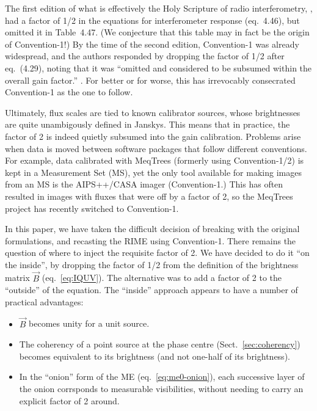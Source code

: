 \documentclass[]{aa}
\begin{document}
The first edition of what is effectively the Holy Scripture of radio interferometry, \citet*{tms1}, had a factor of 1/2 in the equations for interferometer response (eq.~4.46), but omitted it in Table~4.47. (We conjecture that this table may in fact be the origin of Convention-1!) By the time of the second edition, Convention-1 was already widespread, and the authors responded by dropping the factor of 1/2 after eq.~(4.29), noting that it was ``omitted and considered to be subsumed within the overall gain factor.'' \citep[see p. 102]{tms}. For better or for worse, this has irrevocably consecrated Convention-1 as the one to follow.

Ultimately, flux scales are tied to known calibrator sources, whose brightnesses are quite unambigously defined in Janskys. This means that in practice, the factor of 2 is indeed quietly subsumed into the gain calibration. Problems arise when data is moved between software packages that follow different conventions. For example, data calibrated with MeqTrees (formerly using 
Convention-1/2) is kept in a Measurement Set (MS), yet the only tool available for making images from an MS is the AIPS++/CASA imager (Convention-1.) This has often resulted in images with fluxes that were off by a factor of 2, so the MeqTrees project has recently switched to Convention-1.

In this paper, we have taken the difficult decision of breaking with the original formulations, and recasting the RIME using Convention-1. There remains the question of where to inject the requisite factor of 2. We have decided to do it ``on the inside'', by dropping the factor of 1/2 from the \citet{ME4} definition of the brightness matrix $\vec B$ (eq.~\ref{eq:IQUV}). The alternative was to add a factor of 2 to the ``outside'' of the equation. The ``inside'' approach appears to have a number of practical advantages:

\begin{itemize}
\item $\vec B$ becomes unity for a unit source.
\item The coherency of a point source at the phase centre (Sect.~\ref{sec:coherency}) becomes equivalent to its brightness (and not one-half of its brightness).
\item In the ``onion'' form of the ME (eq.~\ref{eq:me0-onion}), each successive layer of the onion corrsponds to measurable visibilities, without needing to carry an explicit factor of 2 around.
\end{itemize}
\end{document}
